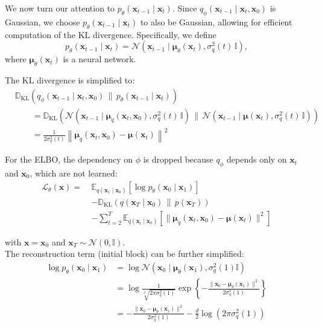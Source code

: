 \documentclass{article}
\newcommand{\x}{\mathbf{x}}
\newcommand{\N}{\mathcal{N}}
\newcommand{\E}{\mathbb{E}}
\newcommand{\D}{\mathbb{D}}
\newcommand{\dklbar}{\,\|\,}
\begin{document}
	We now turn our attention to $p_\theta(\x_{t-1} \mid \x_t)$. Since $q_\phi(\x_{t-1} \mid \x_t, \x_0)$ is Gaussian, we choose $p_\theta(\x_{t-1} \mid \x_t)$ to also be Gaussian, allowing for efficient computation of the KL divergence. Specifically, we define
	\[
	p_\theta(\x_{t-1} \mid \x_t) = \N(\x_{t-1} \mid \boldsymbol{\mu}_\theta(\x_t), \sigma_q^2(t)\, \mathbb{I}),
	\]
	where $\boldsymbol{\mu}_\theta(\x_t)$ is a neural network.
	
	The KL divergence is simplified to:
	\begin{align*}
		&\D_{\mathrm{KL}}\left( q_\phi(\x_{t-1} \mid \x_t, \x_0) \dklbar p_\theta(\x_{t-1} \mid \x_t) \right) \\
		& \qquad = \D_{\mathrm{KL}}\left(
		\N\left(\x_{t-1} \mid \boldsymbol{\mu}_q(\x_t, \x_0), \sigma_q^2(t)\, \mathbb{I}\right)
		\dklbar
		\N\left(\x_{t-1} \mid \boldsymbol{\mu}(\x_t), \sigma_q^2(t)\, \mathbb{I}\right)
		\right) \\
		& \qquad = \frac{1}{2 \sigma_q^2(t)} \left\lVert 
		\boldsymbol{\mu}_q(\x_t, \x_0) - \boldsymbol{\mu}(\x_t)
		\right\rVert^2
	\end{align*}
	
	For the ELBO, the dependency on $\phi$ is dropped because $q_\phi$ depends only on $\x_t$ and $\x_0$, which are not learned:
	$$\begin{aligned}
		\mathcal{L}_{\theta} (\x) =\ & 
		\E_{q (\x_1 \mid \x_0)} 
		\left[ \log p_\theta(\x_0 \mid \x_1) \right] \\
		& - \D_{\mathrm{KL}} \left( q (\x_T \mid \x_{0}) \dklbar p(\x_T) \right) \\
		& - \sum_{t=2}^{T} \E_{q (\x_{t} \mid \x_0)} 
		\left[ \lVert 
		\boldsymbol{\mu}_q(\x_t, \x_0) - \boldsymbol{\mu}(\x_t)
		\rVert^2 \right]
	\end{aligned}$$
	
	with $\x = \x_0$ and $\x_T \sim \N (0, \mathbb{I})$. \\
	
	The reconstruction term (initial block) can be further simplified:
	\begin{align*}
		\log p_\theta (\x_0 \mid \x_1) & = \log \N(\x_0 \mid \boldsymbol{\mu}_\theta (\x_1), \sigma_q^2 (1) \mathbb{I}) \\ & = \log \frac{1}{\sqrt[d]{2 \pi \sigma_q^2 (1)}} \exp \left\{ - \frac{\lVert \x_0 - \boldsymbol{\mu}_\theta (\x_1) \rVert^2}{2 \sigma_q^2 (1)} \right\} \\ & = - \frac{\lVert \x_0 - \boldsymbol{\mu}_\theta (\x_1) \rVert^2}{2 \sigma_q^2 (1)} - \frac{d}{2} \log (2 \pi \sigma_q^2 (1))
	\end{align*}
\end{document}

